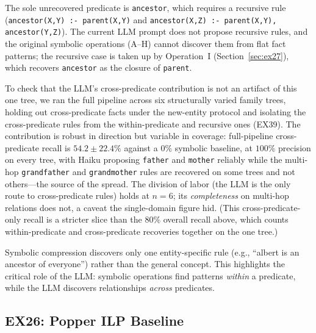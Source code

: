 \documentclass[10pt,conference]{IEEEtran}
\begin{document}
The sole unrecovered predicate is \texttt{ancestor}, which requires a recursive rule (\texttt{ancestor(X,Y) :- parent(X,Y)} and \texttt{ancestor(X,Z) :- parent(X,Y), ancestor(Y,Z)}). The current LLM prompt does not propose recursive rules, and the original symbolic operations (A--H) cannot discover them from flat fact patterns; the recursive case is taken up by Operation~I (Section~\ref{sec:ex27}), which recovers \texttt{ancestor} as the closure of \texttt{parent}.

To check that the LLM's cross-predicate contribution is not an artifact of this one tree, we ran the full pipeline across six structurally varied family trees, holding out cross-predicate facts under the new-entity protocol and isolating the cross-predicate rules from the within-predicate and recursive ones (EX39). The contribution is robust in direction but variable in coverage: full-pipeline cross-predicate recall is $54.2 \pm 22.4\%$ against a $0\%$ symbolic baseline, at $100\%$ precision on every tree, with Haiku proposing \texttt{father} and \texttt{mother} reliably while the multi-hop \texttt{grandfather} and \texttt{grandmother} rules are recovered on some trees and not others---the source of the spread. The division of labor (the LLM is the only route to cross-predicate rules) holds at $n=6$; its \emph{completeness} on multi-hop relations does not, a caveat the single-domain figure hid. (This cross-predicate-only recall is a stricter slice than the $80\%$ overall recall above, which counts within-predicate and cross-predicate recoveries together on the one tree.)

Symbolic compression discovers only one entity-specific rule (e.g., ``albert is an ancestor of everyone'') rather than the general concept. This highlights the critical role of the LLM: symbolic operations find patterns \emph{within} a predicate, while the LLM discovers relationships \emph{across} predicates.

\subsection{EX26: Popper ILP Baseline}
\label{sec:ex26}
\end{document}
